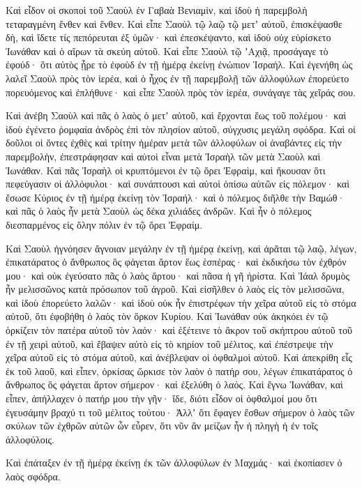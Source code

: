 {\par }{\PP {}Καὶ εἶδον οἱ σκοποὶ τοῦ Σαοὺλ ἐν Γαβαὰ Βενιαμὶν, καὶ ἰδοὺ ἡ παρεμβολὴ τεταραγμένη ἔνθεν καὶ ἔνθεν.
Καὶ εἶπε Σαοὺλ τῷ λαῷ τῷ μετʼ αὐτοῦ, ἐπισκέψασθε δὴ, καὶ ἴδετε τίς πεπόρευται ἐξ ὑμῶν· καὶ ἐπεσκέψαντο, καὶ ἰδοὺ οὐχ εὑρίσκετο Ἰωνάθαν καὶ ὁ αἴρων τὰ σκεύη αὐτοῦ.
Καὶ εἶπε Σαοὺλ τῷ ʼΑχιᾷ, προσάγαγε τὸ ἐφούδ· ὅτι αὐτὸς ᾗρε τὸ ἐφοὺδ ἐν τῇ ἡμέρᾳ ἐκείνῃ ἐνώπιον Ἰσραήλ.
Καὶ ἐγενήθη ὡς λαλεῖ Σαοὺλ πρὸς τὸν ἱερέα, καὶ ὁ ἦχος ἐν τῇ παρεμβολῇ τῶν ἀλλοφύλων ἐπορεύετο πορευόμενος καὶ ἐπλήθυνε· καὶ εἶπε Σαοὺλ πρὸς τὸν ἱερέα, συνάγαγε τὰς χεῖράς σου.
\par }{\PP {}Καὶ ἀνέβη Σαοὺλ καὶ πᾶς ὁ λαὸς ὁ μετʼ αὐτοῦ, καὶ ἔρχονται ἕως τοῦ πολέμου· καὶ ἰδοὺ ἐγένετο ῥομφαία ἀνδρὸς ἐπὶ τὸν πλησίον αὐτοῦ, σύγχυσις μεγάλη σφόδρα.
Καὶ οἱ δοῦλοι οἱ ὄντες ἐχθὲς καὶ τρίτην ἡμέραν μετὰ τῶν ἀλλοφύλων οἱ ἀναβάντες εἰς τὴν παρεμβολὴν, ἐπεστράφησαν καὶ αὐτοὶ εἶναι μετὰ Ἰσραὴλ τῶν μετὰ Σαοὺλ καὶ Ἰωνάθαν.
Καὶ πᾶς Ἰσραὴλ οἱ κρυπτόμενοι ἐν τῷ ὄρει Ἐφραὶμ, καὶ ἤκουσαν ὅτι πεφεύγασιν οἱ ἀλλόφυλοι· καὶ συνάπτουσι καὶ αὐτοὶ ὀπίσω αὐτῶν εἰς πόλεμον·
καὶ ἔσωσε Κύριος ἐν τῇ ἡμέρᾳ ἐκείνῃ τὸν Ἰσραήλ· καὶ ὁ πόλεμος διῆλθε τὴν Βαμώθ· καὶ πᾶς ὁ λαὸς ἦν μετὰ Σαοὺλ ὡς δέκα χιλιάδες ἀνδρῶν. Καὶ ἦν ὁ πόλεμος διεσπαρμένος εἰς ὅλην πόλιν ἐν τῷ ὄρει Ἐφραίμ.
\par }{\PP {}Καὶ Σαοὺλ ἠγνόησεν ἄγνοιαν μεγάλην ἐν τῇ ἡμέρᾳ ἐκείνῃ, καὶ ἀρᾶται τῷ λαῷ, λέγων, ἐπικατάρατος ὁ ἄνθρωπος ὃς φάγεται ἄρτον ἕως ἑσπέρας· καὶ ἐκδικήσω τὸν ἐχθρόν μου· καὶ οὐκ ἐγεύσατο πᾶς ὁ λαὸς ἄρτου·
καὶ πᾶσα ἡ γῆ ἠρίστα. Καὶ Ἰάαλ δρυμὸς ἦν μελισσῶνος κατὰ πρόσωπον τοῦ ἀγροῦ.
Καὶ εἰσῆλθεν ὁ λαὸς εἰς τὸν μελισσῶνα, καὶ ἰδοὺ ἐπορεύετο λαλῶν· καὶ ἰδοὺ οὐκ ἦν ἐπιστρέφων τὴν χεῖρα αὐτοῦ εἰς τὸ στόμα αὐτοῦ, ὅτι ἐφοβήθη ὁ λαὸς τὸν ὅρκον Κυρίου.
Καὶ Ἰωνάθαν οὐκ ἀκηκόει ἐν τῷ ὁρκίζειν τὸν πατέρα αὐτοῦ τὸν λαόν· καὶ ἐξέτεινε τὸ ἄκρον τοῦ σκήπτρου αὐτοῦ τοῦ ἐν τῇ χειρὶ αὐτοῦ, καὶ ἔβαψεν αὐτὸ εἰς τὸ κηρίον τοῦ μέλιτος, καὶ ἐπέστρεψε τὴν χεῖρα αὐτοῦ εἰς τὸ στόμα αὐτοῦ, καὶ ἀνέβλεψαν οἱ ὀφθαλμοὶ αὐτοῦ.
Καὶ ἀπεκρίθη εἷς ἐκ τοῦ λαοῦ, καὶ εἶπεν, ὁρκίσας ὥρκισε τὸν λαὸν ὁ πατήρ σου, λέγων ἐπικατάρατος ὁ ἄνθρωπος ὃς φάγεται ἄρτον σήμερον· καὶ ἐξελύθη ὁ λαός.
Καὶ ἔγνω Ἰωνάθαν, καὶ εἶπεν, ἀπήλλαχεν ὁ πατήρ μου τὴν γῆν· ἴδε, διότι εἶδον οἱ ὀφθαλμοί μου ὅτι ἐγευσάμην βραχύ τι τοῦ μέλιτος τούτου·
Ἀλλʼ ὅτι ἔφαγεν ἔσθων σήμερον ὁ λαὸς τῶν σκύλων τῶν ἐχθρῶν αὐτῶν ὧν εὗρεν, ὅτι νῦν ἂν μείζων ἦν ἡ πληγὴ ἡ ἐν τοῖς ἀλλοφύλοις.
\par }{\PP {}Καὶ ἐπάταξεν ἐν τῇ ἡμέρᾳ ἐκείνῃ ἐκ τῶν ἀλλοφύλων ἐν Μαχμάς· καὶ ἐκοπίασεν ὁ λαὸς σφόδρα.
}
